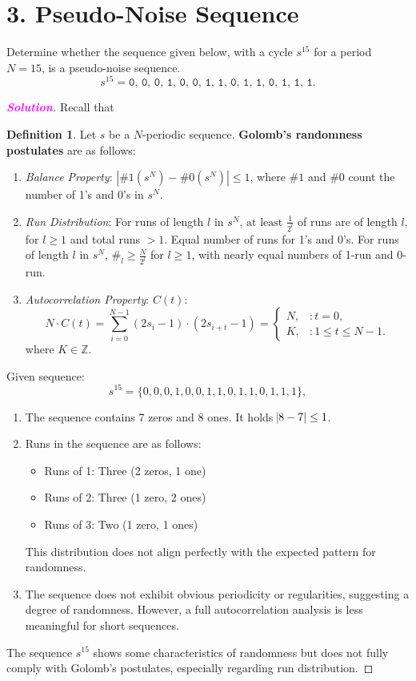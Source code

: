 \documentclass[12pt,openany]{book}
\theoremstyle{definition}
\newtheorem{definition}{Definition}[chapter]
\newcommand{\Z}{\mathbb{Z}}
\newcommand{\sol}{\textcolor{magenta}{\bf Solution}}
\begin{document}
\section*{3. Pseudo-Noise Sequence}
Determine whether the sequence given below, with a cycle \( s^{15} \) for a period \( N=15 \), is a pseudo-noise sequence.
\[
s^{15} = \texttt{0, 0, 0, 1, 0, 0, 1, 1, 0, 1, 1, 0, 1, 1, 1}.
\]
\begin{proof}[\sol]
	Recall that 
	\begin{tcolorbox}[colback=white,colframe=defcolor,arc=5pt,title={\color{white}\bf Golomb's Randomness Postulates}]
		\begin{definition}
			Let \( s \) be a $N$-periodic sequence. \textbf{Golomb's randomness postulates} are as follows:
			\begin{enumerate}[\textbf{R}1]
				\item \textit{Balance Property}: \( \left| \#1(s^N) - \#0(s^N) \right| \leq 1 \), where \( \#1 \) and \( \#0 \) count the number of 1’s and 0’s in \( s^N \).
				\item \textit{Run Distribution}: For runs of length \( l \) in \( s^N \), \( \text{at least } \frac{1}{2^l} \) of runs are of length \( l \), for \( l \geq 1 \) and total runs \( > 1 \). Equal number of runs for 1's and 0's.
				For runs of length \( l \) in \( s^N \), \( \#_{l} \geq \frac{N}{2^l} \) for \( l \geq 1 \), with nearly equal numbers of 1-run and 0-run.
				\item \textit{Autocorrelation Property}: \( C(t) \): 
				\[
				N \cdot C(t)=\sum_{i=0}^{N-1}(2s_i - 1) \cdot (2s_{i+t} - 1)=
				\begin{cases} 
					N, & : t = 0, \\
					K, & : 1 \leq t \leq N - 1.
				\end{cases}
				\]
				where \( K\in\Z\).
			\end{enumerate}
		\end{definition}
	\end{tcolorbox}
	Given sequence: \[
	s^{15} = \{0, 0, 0, 1, 0, 0, 1, 1, 0, 1, 1, 0, 1, 1, 1\},
	\]
	\begin{enumerate}[\textbf{R}1]
		\item The sequence contains 7 zeros and 8 ones. It holds $\abs{8-7}\leq 1$.
		\item Runs in the sequence are as follows:
		\begin{itemize}
			\item Runs of 1: Three (2 zeros, 1 one)
			\item Runs of 2: Three (1 zero, 2 ones)
			\item Runs of 3: Two (1 zero, 1 ones)
		\end{itemize}
		This distribution does not align perfectly with the expected pattern for randomness.
		\item The sequence does not exhibit obvious periodicity or regularities, suggesting a degree of randomness. However, a full autocorrelation analysis is less meaningful for short sequences.
	\end{enumerate} 
	The sequence \( s^{15} \) shows some characteristics of randomness but does not fully comply with Golomb's postulates, especially regarding run distribution.
\end{proof}
\end{document}
